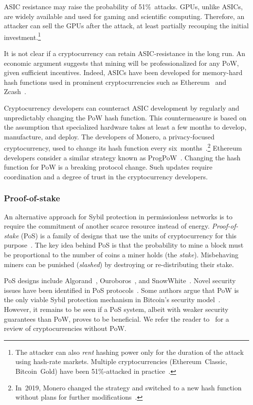 ASIC resistance may raise the probability of 51\%~attacks.
GPUs, unlike ASICs, are widely available and used for gaming and scientific computing.
Therefore, an attacker can sell the GPUs after the attack, at least partially recouping the initial investment.\footnote{The attacker can also \textit{rent} hashing power only for the duration of the attack using hash-rate markets. Multiple cryptocurrencies (Ethereum~Classic, Bitcoin~Gold) have been 51\%-attacked in practice~\cite{Xazax3102019}.}

It is not clear if a cryptocurrency can retain ASIC-resistance in the long run.
An economic argument suggests that mining will be professionalized for any PoW, given sufficient incentives.
Indeed, ASICs have been developed for memory-hard hash functions used in prominent cryptocurrencies such as Ethereum~\cite{OLeary2018} and Zcash~\cite{Floyd2018}.

Cryptocurrency developers can counteract ASIC development by regularly and unpredictably changing the PoW hash function.
This countermeasure is based on the assumption that specialized hardware takes at least a few months to develop, manufacture, and deploy.
The developers of Monero, a privacy-focused cryptocurrency, used to change its hash function every six~months~\cite{Kim2019}.\footnote{In~2019, Monero changed the strategy and switched to a new hash function without plans for further modifications~\cite{dEBRUYNE2019}.}
Ethereum developers consider a similar strategy known as ProgPoW~\cite{OLeary2019}.
Changing the hash function for PoW is a breaking protocol change.
Such updates require coordination and a degree of trust in the cryptocurrency developers.


\subsubsection*{Proof-of-stake}

An alternative approach for Sybil protection in permissionless networks is to require the commitment of another scarce resource instead of energy.
\textit{Proof-of-stake} (PoS) is a family of designs that use the units of cryptocurrency for this purpose~\cite{Bano2019}.
The key idea behind PoS is that the probability to mine a block must be proportional to the number of coins a miner holds (the \textit{stake}).
Misbehaving miners can be punished (\textit{slashed}) by destroying or re-distributing their stake.


PoS designs include Algorand~\cite{Chen2019}, Ouroboros~\cite{Kiayias2017}, and SnowWhite~\cite{Bentov2016a}.
Novel security issues have been identified in PoS protocols~\cite{Fanti2019,Gazi2018,BrownCohen2019,Chitra2020}.
Some authors argue that PoW is the only viable Sybil protection mechanism in Bitcoin's security model~\cite{Andreev2014, Sztorc2015, Poelstra2015}.
However, it remains to be seen if a PoS system, albeit with weaker security guarantees than PoW, proves to be beneficial.
We refer the reader to~\cite{Bentov2016} for a review of cryptocurrencies without PoW.


